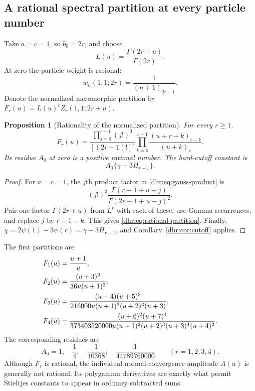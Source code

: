 \documentclass[11pt,letterpaper]{article}
\numberwithin{equation}{section}
\newtheorem{proposition}[theorem]{Proposition}
\theoremstyle{definition}\newtheorem{definition}[theorem]{Definition}
\theoremstyle{remark}\newtheorem{remark}[theorem]{Remark}
\begin{document}
\subsection{A rational spectral partition at every particle number}
Take $a=c=1$, so $b_0=2r$, and choose
\begin{equation}\label{dhr:eq:integer-normalization}
 L(u)=\frac{\Gamma(2r+u)}{\Gamma(2r)}.
\end{equation}
At zero the particle weight is rational:
\[
 w_n(1,1;2r)=\frac1{(n+1)_{2r-1}}.
\]
Denote the normalized meromorphic partition by
$F_r(u)=L(u)^rZ_r(1,1;2r+u)$.

\begin{proposition}[Rationality of the normalized partition]
\label{dhr:prop:rational-partition}
For every $r\geq1$,
\begin{equation}\label{dhr:eq:rational-partition}
 \boxed{F_r(u)=
 \frac{\displaystyle\prod_{j=0}^{r-1}(j!)^3}{[(2r-1)!]^r}
 \prod_{k=0}^{r-1}\frac{(u+r+k)_{r-k}}{(u+k)_r}.}
\end{equation}
Its residue $A_0$ at zero is a positive rational number. The hard-cutoff
constant is
\begin{equation}\label{dhr:eq:integer-cutoff}
 A_0\{\gamma-3H_{r-1}\}.
\end{equation}
\end{proposition}
\begin{proof}
For $a=c=1$, the $j$th product factor in
\eqref{dhr:eq:gauss-product} is
\[
 (j!)^3\frac{\Gamma(r-1+u-j)}{\Gamma(2r-1+u-j)^2}.
\]
Pair one factor $\Gamma(2r+u)$ from $L^r$ with each of these,
use Gamma recurrences, and replace $j$ by $r-1-k$.
This gives \eqref{dhr:eq:rational-partition}. Finally,
$\chi=2\psi(1)-3\psi(r)=\gamma-3H_{r-1}$, and
Corollary~\ref{dhr:cor:cutoff} applies.
\end{proof}

The first partitions are
\begin{align}
 F_1(u)&=\frac{u+1}{u},\notag\\
 F_2(u)&=\frac{(u+3)^2}{36u(u+1)^2},\notag\\
 F_3(u)&=\frac{(u+4)(u+5)^3}
 {216000u(u+1)^2(u+2)^3(u+3)},\notag\\
 F_4(u)&=\frac{(u+6)^2(u+7)^4}
 {373403520000u(u+1)^2(u+2)^3(u+3)^4(u+4)^2}.
 \label{dhr:eq:small-partitions}
\end{align}
The corresponding residues are
\begin{equation}\label{dhr:eq:small-residues}
 A_0=1,\quad\frac14,\quad\frac1{10368},\quad
 \frac1{44789760000}\qquad(r=1,2,3,4).
\end{equation}
Although $F_r$ is rational, the individual normal-convergence amplitude
$A(u)$ is generally not rational. Its polygamma derivatives are exactly
what permit Stieltjes constants to appear in ordinary subtracted sums.
\end{document}
